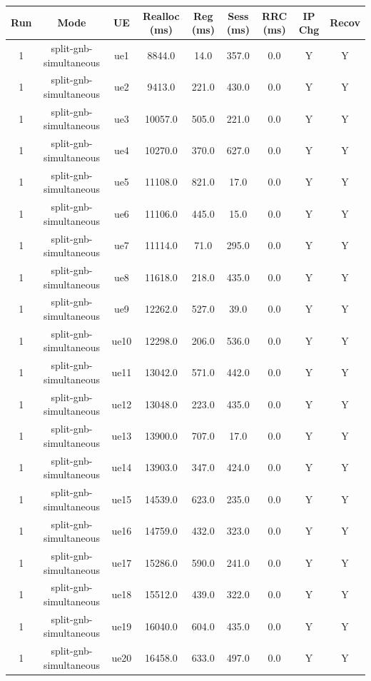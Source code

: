 \begin{table}[ht]
\centering
\begin{tabular}{|c|c|c|c|c|c|c|c|c|}
\hline
Run & Mode & UE & Realloc (ms) & Reg (ms) & Sess (ms) & RRC (ms) & IP Chg & Recov \\
\hline
1 & split-gnb-simultaneous & ue1 & 8844.0 & 14.0 & 357.0 & 0.0 & Y & Y \\
1 & split-gnb-simultaneous & ue2 & 9413.0 & 221.0 & 430.0 & 0.0 & Y & Y \\
1 & split-gnb-simultaneous & ue3 & 10057.0 & 505.0 & 221.0 & 0.0 & Y & Y \\
1 & split-gnb-simultaneous & ue4 & 10270.0 & 370.0 & 627.0 & 0.0 & Y & Y \\
1 & split-gnb-simultaneous & ue5 & 11108.0 & 821.0 & 17.0 & 0.0 & Y & Y \\
1 & split-gnb-simultaneous & ue6 & 11106.0 & 445.0 & 15.0 & 0.0 & Y & Y \\
1 & split-gnb-simultaneous & ue7 & 11114.0 & 71.0 & 295.0 & 0.0 & Y & Y \\
1 & split-gnb-simultaneous & ue8 & 11618.0 & 218.0 & 435.0 & 0.0 & Y & Y \\
1 & split-gnb-simultaneous & ue9 & 12262.0 & 527.0 & 39.0 & 0.0 & Y & Y \\
1 & split-gnb-simultaneous & ue10 & 12298.0 & 206.0 & 536.0 & 0.0 & Y & Y \\
1 & split-gnb-simultaneous & ue11 & 13042.0 & 571.0 & 442.0 & 0.0 & Y & Y \\
1 & split-gnb-simultaneous & ue12 & 13048.0 & 223.0 & 435.0 & 0.0 & Y & Y \\
1 & split-gnb-simultaneous & ue13 & 13900.0 & 707.0 & 17.0 & 0.0 & Y & Y \\
1 & split-gnb-simultaneous & ue14 & 13903.0 & 347.0 & 424.0 & 0.0 & Y & Y \\
1 & split-gnb-simultaneous & ue15 & 14539.0 & 623.0 & 235.0 & 0.0 & Y & Y \\
1 & split-gnb-simultaneous & ue16 & 14759.0 & 432.0 & 323.0 & 0.0 & Y & Y \\
1 & split-gnb-simultaneous & ue17 & 15286.0 & 590.0 & 241.0 & 0.0 & Y & Y \\
1 & split-gnb-simultaneous & ue18 & 15512.0 & 439.0 & 322.0 & 0.0 & Y & Y \\
1 & split-gnb-simultaneous & ue19 & 16040.0 & 604.0 & 435.0 & 0.0 & Y & Y \\
1 & split-gnb-simultaneous & ue20 & 16458.0 & 633.0 & 497.0 & 0.0 & Y & Y \\

\end{tabular}
\end{table}
